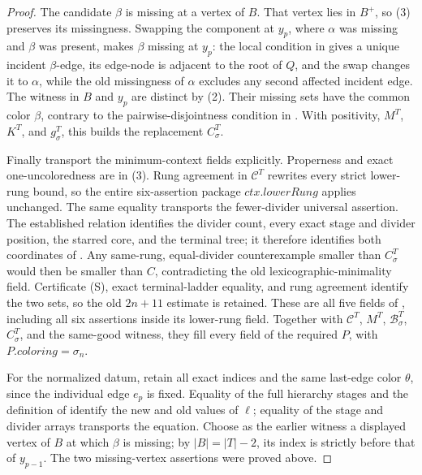 \begin{proof}
The candidate \(\beta\) is missing at a vertex of \(B\).  That vertex lies
in \(B^+\), so (3) preserves its missingness.  Swapping the component at
\(y_p\), where \(\alpha\) was missing and \(\beta\) was present, makes
\(\beta\) missing at \(y_p\): the local condition in
 gives a unique incident
\(\beta\)-edge, its edge-node is adjacent to the root of \(Q\), and the
swap changes it to \(\alpha\), while the old missingness of \(\alpha\)
excludes any second affected incident edge.  The witness in \(B\) and
\(y_p\) are distinct by (2).  Their missing sets have the common color
\(\beta\), contrary to the pairwise-disjointness condition in
.  With positivity, \(M^T\), \(K^T\),
and \(g^T_\sigma\), this builds the replacement
 \(C^T_\sigma\).

Finally transport the minimum-context fields explicitly.  Properness and
exact one-uncoloredness are in (3).  Rung agreement in \(\mathcal C^T\)
rewrites every strict lower-rung bound, so the entire six-assertion package
\(\mathit{ctx.lowerRung}\) applies unchanged.  The same equality transports
the fewer-divider universal assertion.  The established
 relation identifies the divider count, every
exact stage and divider position, the starred core, and the terminal tree;
it therefore identifies both coordinates of
.  Any same-rung,
equal-divider counterexample smaller than \(C^T_\sigma\) would then be
smaller than \(C\), contradicting the old lexicographic-minimality field.
Certificate (S), exact terminal-ladder equality, and rung agreement identify
the two  sets, so the old \(2n+11\) estimate
is retained.  These are all five fields of
, including all six
assertions inside its lower-rung field.  Together with \(\mathcal C^T\),
\(M^T\), \(\mathcal B^T_\sigma\), \(C^T_\sigma\), and the same-good
witness, they fill every field of the required
 \(P\), with
\(P.\mathit{coloring}=\sigma_n\).

For the normalized datum, retain all exact indices and the same last-edge
color \(\theta\), since the individual edge \(e_p\) is fixed.  Equality of
the full hierarchy stages and the definition of
 identify the new and old values of
\(\ell\); equality of the stage and divider arrays transports the
 equation.  Choose as the earlier witness a
displayed vertex of \(B\) at which \(\beta\) is missing; by
\(|B|=|T|-2\), its index is strictly before that of \(y_{p-1}\).  The two
missing-vertex assertions were proved above.


\end{proof}
